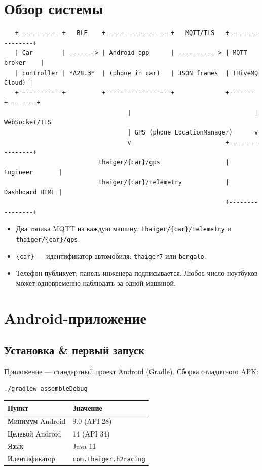 \documentclass[11pt,a4paper,oneside]{report}
\newcommand{\code}[1]{\texttt{#1}}
\begin{document}
\section{Обзор системы}

\begin{lstlisting}
   +------------+   BLE    +------------------+   MQTT/TLS   +----------------+
   | Car        | -------> | Android app      | -----------> | MQTT broker    |
   | controller | *A28.3*  | (phone in car)   | JSON frames  | (HiveMQ Cloud) |
   +------------+          +------------------+              +-------+--------+
                                  |                                  | WebSocket/TLS
                                  | GPS (phone LocationManager)      v
                                  v                          +----------------+
                          thaiger/{car}/gps                  | Engineer       |
                          thaiger/{car}/telemetry            | Dashboard HTML |
                                                             +----------------+
\end{lstlisting}
\begin{itemize}
  \item Два топика MQTT на каждую машину: \code{thaiger/\{car\}/telemetry} и
    \code{thaiger/\{car\}/gps}.
  \item \code{\{car\}} --- идентификатор автомобиля: \code{thaiger7} или
    \code{bengalo}.
  \item Телефон публикует; панель инженера подписывается. Любое число ноутбуков
    может одновременно наблюдать за одной машиной.
\end{itemize}

\section{Android-приложение}

\subsection{Установка \& первый запуск}
Приложение --- стандартный проект Android (Gradle). Сборка отладочного APK:

\begin{lstlisting}
./gradlew assembleDebug
\end{lstlisting}

\begin{tabularx}{\linewidth}{@{}lL@{}}
\toprule
\textbf{Пункт} & \textbf{Значение}\\
\midrule
Минимум Android & 9.0 (API 28)\\
Целевой Android & 14 (API 34)\\
Язык & Java 11\\
Идентификатор & \code{com.thaiger.h2racing}\\
\bottomrule
\end{tabularx}
\end{document}
